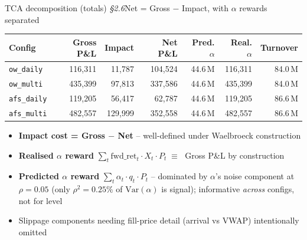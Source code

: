 \documentclass[aspectratio=169,11pt]{beamer}
\newcommand{\hilite}[1]{\textcolor{accent}{\textbf{#1}}}
\begin{document}
\begin{frame}{TCA decomposition (totals) \hfill \emph{\S2.6}}{Net = Gross $-$ Impact, with $\alpha$ rewards separated}

  \centering
  \footnotesize
  \begin{tabular}{lrrrrrr}
  \toprule
  Config & Gross P\&L & Impact & Net P\&L & Pred. $\alpha$ & Real. $\alpha$ & Turnover \\
  \midrule
  \texttt{ow\_daily}  & 116{,}311 & 11{,}787   & 104{,}524 & 44.6\,M & 116{,}311 & 84.0\,M \\
  \texttt{ow\_multi}  & 435{,}399 & 97{,}813   & 337{,}586 & 44.6\,M & 435{,}399 & 84.0\,M \\
  \texttt{afs\_daily} & 119{,}205 & 56{,}417   & 62{,}787  & 44.6\,M & 119{,}205 & 86.6\,M \\
  \texttt{afs\_multi} & 482{,}557 & 129{,}999  & 352{,}558 & 44.6\,M & 482{,}557 & 86.6\,M \\
  \bottomrule
  \end{tabular}

  \vspace{0.7em}
  \begin{itemize}\small
    \item \hilite{Impact cost = Gross $-$ Net} -- well-defined under Waelbroeck construction
    \item \hilite{Realised $\alpha$ reward} $\sum_t \mathrm{fwd\_ret}_t \cdot X_t \cdot P_t \;\equiv\;$ Gross P\&L by construction
    \item \hilite{Predicted $\alpha$ reward} $\sum_t \alpha_t \cdot q_t \cdot P_t$ -- dominated by $\alpha$'s noise component at $\rho=0.05$ (only $\rho^2 = 0.25\%$ of $\mathrm{Var}(\alpha)$ is signal); informative \emph{across} configs, not for level
    \item Slippage components needing fill-price detail (arrival vs VWAP) intentionally omitted
  \end{itemize}
\end{frame}
\end{document}
